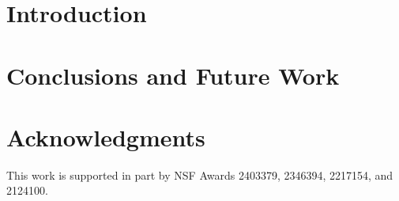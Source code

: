 \documentclass[runningheads]{llncs}
\begin{document}
\section{Introduction}\label{sec:intro}


\label{sec:bg}






\section{Conclusions and Future Work}


\section*{Acknowledgments}
This work is supported in part by NSF Awards 2403379, 2346394, 2217154, and 2124100.




\clearpage
\onecolumn
\end{document}
